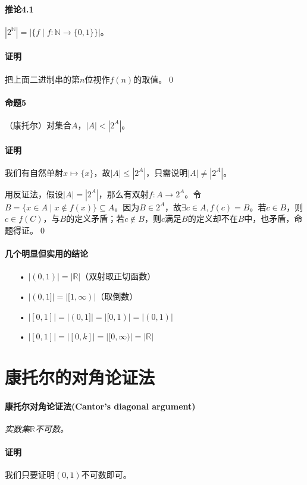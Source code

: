 \documentclass[b5paper,oneside]{ctexbook}
\begin{document}
\paragraph{推论4.1}$|2^\mathbb{N}|=|\{f\mid f:\mathbb{N}\to\{0,1\}\}|$。
\paragraph{证明}把上面二进制串的第$n$位视作$f(n)$的取值。\hfill\qed
\paragraph{命题5}（康托尔）对集合$A$，$|A|<|2^A|$。
\paragraph{证明}我们有自然单射$x\mapsto\{x\}$，故$|A|\leq |2^A|$，只需说明$|A|\neq |2^A|$。

用反证法，假设$|A|=|2^A|$，那么有双射$f:A\to 2^A$。令$B=\{x\in A\mid x\not\in f(x)\}\subseteq A$。因为$B\in 2^A$，故$\exists c\in A, f(c)=B$。若$c\in B$，则$c\in f(C)$，与$B$的定义矛盾；若$c\not\in B$，则$c$满足$B$的定义却不在$B$中，也矛盾，命题得证。\hfill\qed
\paragraph{几个明显但实用的结论}
\begin{enumerate}
\item[•]$|(0,1)|=|\mathbb{R}|$（双射取正切函数）
\item[•]$|(0,1]|=|[1,\infty )|$（取倒数）
\item[•]$|[0,1]|=|(0,1]|=|[0,1)|=|(0,1)|$
\item[•]$|[0,1]|=|[0,k]|=|[0,\infty)|=|\mathbb{R}|$
\end{enumerate}
\section{康托尔的对角论证法}
\paragraph{康托尔对角论证法(Cantor's diagonal argument)}\textit{实数集$\mathbb{R}$不可数。}
\paragraph{证明}我们只要证明$(0,1)$不可数即可。
\end{document}
